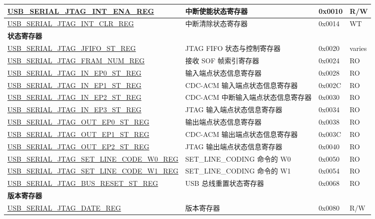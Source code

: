 \begin{longtable}{ | p{7.4cm} | p{5.2cm} | p{1.2cm} | p{1.7cm} | }
\hyperref[regdesc:USBSERIALJTAGINTENAREG]{USB\_SERIAL\_JTAG\_INT\_ENA\_REG} & 中断使能状态寄存器 & 0x0010 & R/W \\ \hline
\hyperref[regdesc:USBSERIALJTAGINTCLRREG]{USB\_SERIAL\_JTAG\_INT\_CLR\_REG} & 中断清除状态寄存器 & 0x0014 & WT \\ \hline
\multicolumn{4}{|l|}{\textbf{状态寄存器}} \\ \hline
\hyperref[regdesc:USBSERIALJTAGJFIFOSTREG]{USB\_SERIAL\_JTAG\_JFIFO\_ST\_REG} & JTAG FIFO 状态与控制寄存器 & 0x0020 & varies \\ \hline
\hyperref[regdesc:USBSERIALJTAGFRAMNUMREG]{USB\_SERIAL\_JTAG\_FRAM\_NUM\_REG} & 接收 SOF 帧索引寄存器 & 0x0024 & RO \\ \hline
\hyperref[regdesc:USBSERIALJTAGINEP0STREG]{USB\_SERIAL\_JTAG\_IN\_EP0\_ST\_REG} & 输入端点状态信息寄存器 & 0x0028 & RO \\ \hline
\hyperref[regdesc:USBSERIALJTAGINEP1STREG]{USB\_SERIAL\_JTAG\_IN\_EP1\_ST\_REG} & CDC-ACM 输入端点状态信息寄存器 & 0x002C & RO \\ \hline
\hyperref[regdesc:USBSERIALJTAGINEP2STREG]{USB\_SERIAL\_JTAG\_IN\_EP2\_ST\_REG} & CDC-ACM 中断输入端点状态信息寄存器 & 0x0030 & RO \\ \hline
\hyperref[regdesc:USBSERIALJTAGINEP3STREG]{USB\_SERIAL\_JTAG\_IN\_EP3\_ST\_REG} & JTAG 输入端点状态信息寄存器 & 0x0034 & RO \\ \hline
\hyperref[regdesc:USBSERIALJTAGOUTEP0STREG]{USB\_SERIAL\_JTAG\_OUT\_EP0\_ST\_REG} & 输出端点状态信息寄存器 & 0x0038 & RO \\ \hline
\hyperref[regdesc:USBSERIALJTAGOUTEP1STREG]{USB\_SERIAL\_JTAG\_OUT\_EP1\_ST\_REG} & CDC-ACM 输出端点状态信息寄存器 & 0x003C & RO \\ \hline
\hyperref[regdesc:USBSERIALJTAGOUTEP2STREG]{USB\_SERIAL\_JTAG\_OUT\_EP2\_ST\_REG} & JTAG 输出端点状态信息寄存器 & 0x0040 & RO \\ \hline
\hyperref[regdesc:USBSERIALJTAGSETLINECODEW0REG]{USB\_SERIAL\_JTAG\_SET\_LINE\_CODE\_W0\_REG} & SET\_LINE\_CODING 命令的 W0 & 0x0050 & RO \\ \hline
\hyperref[regdesc:USBSERIALJTAGSETLINECODEW1REG]{USB\_SERIAL\_JTAG\_SET\_LINE\_CODE\_W1\_REG} & SET\_LINE\_CODING 命令的 W1 & 0x0054 & RO \\ \hline
\hyperref[regdesc:USBSERIALJTAGBUSRESETSTREG]{USB\_SERIAL\_JTAG\_BUS\_RESET\_ST\_REG} & USB 总线重置状态寄存器 & 0x0068 & RO \\ \hline
\multicolumn{4}{|l|}{\textbf{版本寄存器}} \\ \hline
\hyperref[regdesc:USBSERIALJTAGDATEREG]{USB\_SERIAL\_JTAG\_DATE\_REG} & 版本寄存器 & 0x0080 & R/W \\ \hline
\end{longtable}
